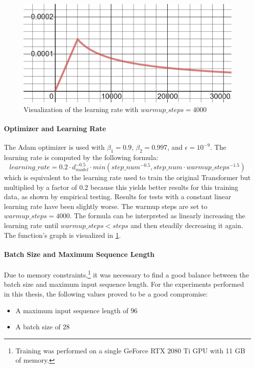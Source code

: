 \begin{figure}[h]
\centering
\includegraphics[width=0.6\paperwidth]{figures/learning-rate}
\caption{Visualization of the learning rate with $warmup\_steps = 4000$}
\label{fig:learning-rate}
\end{figure}

\paragraph{Optimizer and Learning Rate}

The Adam optimizer \cite{article} is used with $\beta_1=0.9$, $\beta_2=0.997$, and $\epsilon = 10^{-9}$.
The learning rate is computed by the following formula:
\[
	learning\_rate = 0.2 \cdot d_{model}^{-0.5} \cdot min(step\_num^{-0.5}, step\_num \cdot warmup\_steps^{-1.5})
\]
which is equivalent to the learning rate used to train the original Transformer \cite[p.~7]{1706.03762} but multiplied by a factor of $0.2$ because this yields better results for this training data, as shown by empirical testing.
Results for tests with a constant linear learning rate have been slightly worse.
The warmup steps are set to $warmup\_steps = 4000$.
The formula can be interpreted as linearly increasing the learning rate until $warmup\_steps < steps$ and then steadily decreasing it again.
The function's graph is visualized in \cref{fig:learning-rate}.

\paragraph{Batch Size and Maximum Sequence Length}

Due to memory constraints,\footnote{Training was performed on a single GeForce RTX 2080 Ti GPU with 11 GB of memory.} it was necessary to find a good balance between the batch size and maximum input sequence length.
For the experiments performed in this thesis, the following values proved to be a good compromise:
\begin{itemize}
\item A maximum input sequence length of $96$ %
\item A batch size of $28$
\end{itemize}

